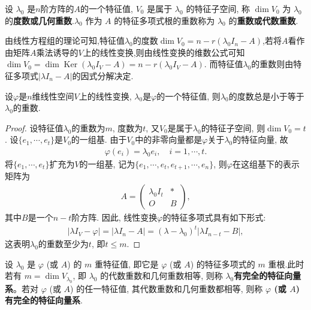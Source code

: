 \documentclass[../../main.tex]{subfiles}%
\begin{document}
\begin{definition}[矩阵的几何重数与代数重数]
设 $\lambda_0$ 是$n$阶方阵的$A$的一个特征值, $V_0$ 是属于 $\lambda_0$ 的特征子空间, 称 $\dim V_0$ 为 $\lambda_0$ 的\textbf{度数或几何重数}.$\lambda_0$ 作为 $A$ 的特征多项式根的重数称为 $\lambda_0$ 的\textbf{重数或代数重数}.
\end{definition}
\begin{note}
由线性方程组的理论可知,特征值$\lambda_0$的度数$\dim V_0  = n - r(\lambda_0 I_n - A)$,若将$A$看作由矩阵$A$乘法诱导的$V$上的线性变换,则由线性变换的维数公式可知$\dim V_0  =\dim \operatorname{Ker}(\lambda_0 I_V - A)= n - r(\lambda_0 I_V - A)$.
而特征值$\lambda_0$的重数则由特征多项式$|\lambda I_n - A|$的因式分解决定.
\end{note}

\begin{lemma}[特征值的几何重数数总小于代数重数]\label{lemma:特征值的度数总小于重数}
设$\varphi$是$n$维线性空间$V$上的线性变换, $\lambda_0$是$\varphi$的一个特征值, 则$\lambda_0$的度数总是小于等于$\lambda_0$的重数.
\end{lemma}
\begin{proof}

设特征值$\lambda_0$的重数为$m$, 度数为$t$, 又$V_0$是属于$\lambda_0$的特征子空间, 则$\dim V_0 = t$. 设$\{e_1, \cdots, e_t\}$是$V_0$的一组基. 由于$V_0$中的非零向量都是$\varphi$关于$\lambda_0$的特征向量, 故
\begin{align*}
\varphi(e_i) = \lambda_0 e_i, \quad i = 1, \cdots, t.
\end{align*}
将$\{e_1, \cdots, e_t\}$扩充为$V$的一组基, 记为$\{e_1, \cdots, e_t, e_{t+1}, \cdots, e_n\}$, 则$\varphi$在这组基下的表示矩阵为
\begin{align*}
A = \begin{pmatrix}
\lambda_0 I_t & * \\
O & B
\end{pmatrix},
\end{align*}
其中$B$是一个$n-t$阶方阵. 因此, 线性变换$\varphi$的特征多项式具有如下形式:
\begin{align*}
|\lambda I_V - \varphi| = |\lambda I_n - A| = (\lambda - \lambda_0)^t |\lambda I_{n-t} - B|,
\end{align*}
这表明$\lambda_0$的重数至少为$t$, 即$t \leqslant  m$.

\end{proof}

\begin{definition}[完全的特征向量系]
设 $\lambda_0$ 是 $\varphi$ (或 $A$) 的 $m$ 重特征值, 即它是 $\varphi$ (或 $A$) 的特征多项式的 $m$ 重根.此时若有 $m = \dim V_{\lambda_0}$, 即 $\lambda_0$ 的代数重数和几何重数相等, 则称  \textbf{$\lambda_0$有完全的特征向量系}。若对 $\varphi$ (或 $A$) 的任一特征值, 其代数重数和几何重数都相等, 则称  \textbf{$\varphi$ (或 $A$) 有完全的特征向量系}.
\end{definition}
\end{document}
